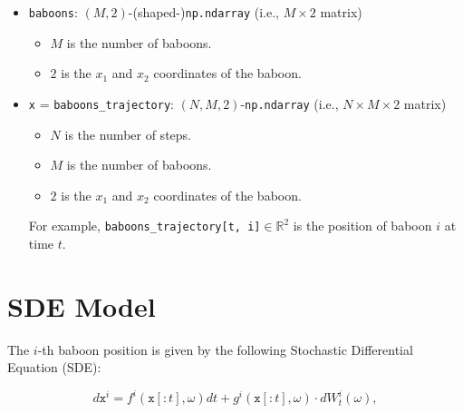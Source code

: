 \documentclass[
    article,
    oneside,
]{memoir}
\begin{document}
\begin{itemize}
    \item \texttt{baboons}: $(M, 2)$-(shaped-)\texttt{np.ndarray} (i.e., $M \times 2$ matrix)
    \begin{itemize}
        \item $M$ is the number of baboons.
        \item $2$ is the $x_1$ and $x_2$ coordinates of the baboon.
    \end{itemize}
    
    \item \texttt{x} = \texttt{baboons\_trajectory}: $(N, M, 2)$-\texttt{np.ndarray} (i.e., $N \times M \times 2$ matrix)
    \begin{itemize}
        \item $N$ is the number of steps.
        \item $M$ is the number of baboons.
        \item $2$ is the $x_1$ and $x_2$ coordinates of the baboon.
    \end{itemize}
    For example, \texttt{baboons\_trajectory[t, i]}\(\in\mathbb{R}^2\) is the position of baboon $i$ at time $t$.
\end{itemize}

\section{SDE Model}

The $i$-th baboon position is given by the following Stochastic Differential
Equation (SDE):

\begin{equation}
    d\texttt{x}^i = f^i(\texttt{x}[:t], \omega) dt + g^i(\texttt{x}[:t], \omega) \cdot dW^i_t(\omega),
\end{equation}
\end{document}
